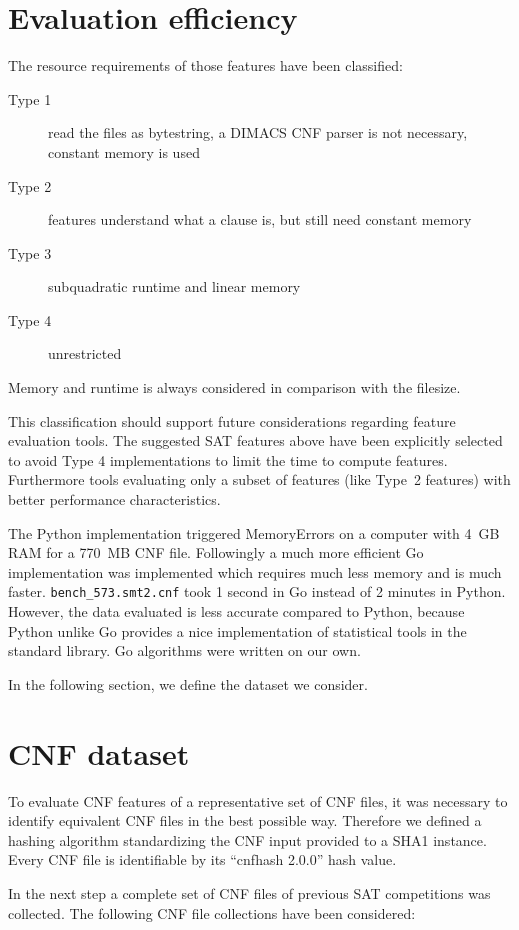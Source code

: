 \section{Evaluation efficiency}
\label{sec:features-efficiency}
%
The resource requirements of those features have been classified:
\begin{description}
  \item[Type 1] read the files as bytestring, a DIMACS CNF parser is not necessary, constant memory is used
  \item[Type 2] features understand what a clause is, but still need constant memory
  \item[Type 3] subquadratic runtime and linear memory
  \item[Type 4] unrestricted
\end{description}
%
Memory and runtime is always considered in comparison with the filesize.

This classification should support future considerations regarding feature evaluation tools.
The suggested SAT features above have been explicitly selected to avoid Type 4 implementations to limit the time to compute features.
Furthermore tools evaluating only a subset of features (like Type~2 features) with better performance characteristics.

The Python implementation triggered MemoryErrors on a computer with 4~GB RAM for a 770~MB CNF file.
Followingly a much more efficient Go implementation was implemented which requires much less memory and is much faster.
\texttt{bench\_573.smt2.cnf} took 1 second in Go instead of 2 minutes in Python.
However, the data evaluated is less accurate compared to Python, because Python unlike Go provides a nice implementation of statistical tools in the standard library. Go algorithms were written on our own.

In the following section, we define the dataset we consider.

\section{CNF dataset}
\label{sec:features-dataset}
%
To evaluate CNF features of a representative set of CNF files, it was necessary to identify equivalent CNF files in the best possible way.
Therefore we defined a hashing algorithm standardizing the CNF input provided to a SHA1 instance. Every CNF file is identifiable by its
\enquote{cnfhash 2.0.0} hash value.

In the next step a complete set of CNF files of previous SAT competitions was collected.
The following CNF file collections have been considered:

